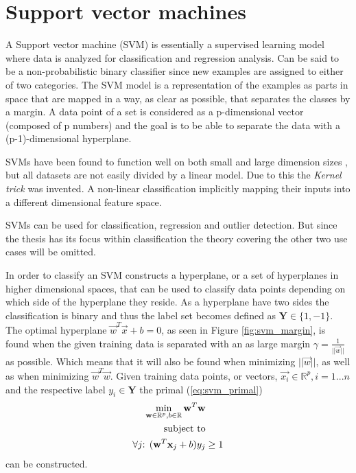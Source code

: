 \section{Support vector machines}
\label{sec:mltheory:svm}

A Support vector machine (SVM) is essentially a supervised learning model where data is analyzed for classification and regression analysis. Can be said to be a non-probabilistic binary classifier since new examples are assigned to either of two categories. The SVM model is a representation of the examples as parts in space that are mapped in a way, as clear as possible, that separates the classes by a margin. A data point of a set is considered as a p-dimensional vector (composed of p numbers) and the goal is to be able to separate the data with a (p-1)-dimensional hyperplane. 

SVMs have been found to function well on both small and large dimension sizes \cite{vert2005kernel}, but all datasets are not easily divided by a linear model.  Due to this the \emph{Kernel trick} was invented. A non-linear classification implicitly mapping their inputs into a different dimensional feature space.

SVMs can be used for classification, regression and outlier detection. But since the thesis has its focus within classification the theory covering the other two use cases will be omitted. 

In order to classify an SVM constructs a hyperplane, or a set of hyperplanes in higher dimensional spaces, that can be used to classify data points depending on which side of the hyperplane they reside. As a hyperplane have two sides the classification is binary and thus the label set becomes defined as $\mathbf{Y} \in \{1,-1\}$. The optimal hyperplane $\vec{w}^T\vec{x}+b = 0$, as seen in Figure \ref{fig:svm_margin}, is found when the given training data is separated with an as large margin $\gamma = \frac{1}{||{\vec{w}||}}$ as possible. Which means that it will also be found when minimizing $||\vec{w}||$, as well as when minimizing $\vec{w}^T\vec{w}$. 
Given training data points, or vectors, $\vec{x_i} \in \mathbb{R}^p, i=1...n$ and the respective label $y_i \in \mathbf{Y}$ the primal (\ref{eq:svm_primal})
\begin{equation}
\label{eq:svm_primal}
\begin{split}
\min_{\vec{w}\in\mathbb{R}^p,b\in\mathbb{R}}{\vec{w}^T\vec{w}}& \\
\textnormal{subject to} & \\
\forall j\textnormal{: } (\vec{w}^T\vec{x}_j + b)y_j & \geq 1
\end{split}
\end{equation}
can be constructed.

